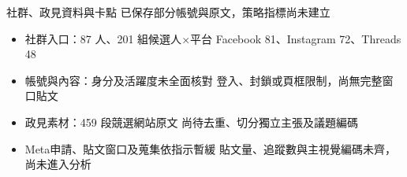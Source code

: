 \documentclass[aspectratio=169,11pt]{beamer}
\begin{document}
\begin{frame}{社群、政見資料與卡點}
{\color{accent}\large 已保存部分帳號與原文，策略指標尚未建立}\par\vspace{4mm}
\begin{itemize}\setlength{\itemsep}{3mm}
\item 社群入口：87 人、201 組候選人$\times$平台\newline
      Facebook 81、Instagram 72、Threads 48
\item 帳號與內容：身分及活躍度未全面核對\newline
      登入、封鎖或頁框限制，尚無完整窗口貼文
\item 政見素材：459 段競選網站原文\newline
      尚待去重、切分獨立主張及議題編碼
\item Meta申請、貼文窗口及蒐集依指示暫緩\newline
      貼文量、追蹤數與主視覺編碼未齊，尚未進入分析
\end{itemize}
\end{frame}

\end{document}
